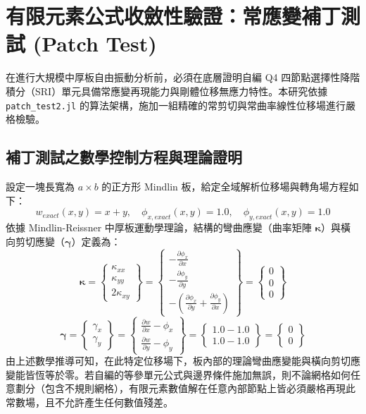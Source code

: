 \section{有限元素公式收斂性驗證：常應變補丁測試 (Patch Test)}

在進行大規模中厚板自由振動分析前，必須在底層證明自編 Q4 四節點選擇性降階積分（SRI）單元具備常應變再現能力與剛體位移無應力特性。本研究依據 \texttt{patch\_test2.jl} 的算法架構，施加一組精確的常剪切與常曲率線性位移場進行嚴格檢驗。

\subsection{補丁測試之數學控制方程與理論證明}
設定一塊長寬為 $a \times b$ 的正方形 Mindlin 板，給定全域解析位移場與轉角場方程如下：
\begin{equation}
w_{exact}(x,y) = x + y, \quad \phi_{x,exact}(x,y) = 1.0, \quad \phi_{y,exact}(x,y) = 1.0
\end{equation}
依據 Mindlin-Reissner 中厚板運動學理論，結構的彎曲應變（曲率矩陣 $\boldsymbol{\kappa}$）與橫向剪切應變（$\boldsymbol{\gamma}$）定義為：
\begin{equation}
\boldsymbol{\kappa} = \begin{Bmatrix} \kappa_{xx} \\ \kappa_{yy} \\ 2\kappa_{xy} \end{Bmatrix} = \begin{Bmatrix} -\frac{\partial \phi_x}{\partial x} \\ -\frac{\partial \phi_y}{\partial y} \\ -\left(\frac{\partial \phi_x}{\partial y} + \frac{\partial \phi_y}{\partial x}\right) \end{Bmatrix} = \begin{Bmatrix} 0 \\ 0 \\ 0 \end{Bmatrix}
\end{equation}
\begin{equation}
\boldsymbol{\gamma} = \begin{Bmatrix} \gamma_x \\ \gamma_y \end{Bmatrix} = \begin{Bmatrix} \frac{\partial w}{\partial x} - \phi_x \\ \frac{\partial w}{\partial y} - \phi_y \end{Bmatrix} = \begin{Bmatrix} 1.0 - 1.0 \\ 1.0 - 1.0 \end{Bmatrix} = \begin{Bmatrix} 0 \\ 0 \end{Bmatrix}
\end{equation}
由上述數學推導可知，在此特定位移場下，板內部的理論彎曲應變能與橫向剪切應變能皆恆等於零。若自編的等參單元公式與邊界條件施加無誤，則不論網格如何任意劃分（包含不規則網格），有限元素數值解在任意內部節點上皆必須嚴格再現此常數場，且不允許產生任何數值殘差。


